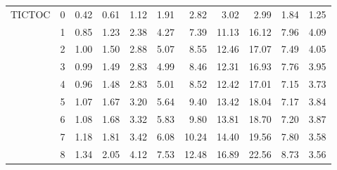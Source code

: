 \begin{tabular}{llrrrrrrrrr}
TICTOC & 0 & 0.42 & 0.61 & 1.12 & 1.91 &  2.82 &  3.02 &  2.99 & 1.84 & 1.25 \\
       & 1 & 0.85 & 1.23 & 2.38 & 4.27 &  7.39 & 11.13 & 16.12 & 7.96 & 4.09 \\
       & 2 & 1.00 & 1.50 & 2.88 & 5.07 &  8.55 & 12.46 & 17.07 & 7.49 & 4.05 \\
       & 3 & 0.99 & 1.49 & 2.83 & 4.99 &  8.46 & 12.31 & 16.93 & 7.76 & 3.95 \\
       & 4 & 0.96 & 1.48 & 2.83 & 5.01 &  8.52 & 12.42 & 17.01 & 7.15 & 3.73 \\
       & 5 & 1.07 & 1.67 & 3.20 & 5.64 &  9.40 & 13.42 & 18.04 & 7.17 & 3.84 \\
       & 6 & 1.08 & 1.68 & 3.32 & 5.83 &  9.80 & 13.81 & 18.70 & 7.20 & 3.87 \\
       & 7 & 1.18 & 1.81 & 3.42 & 6.08 & 10.24 & 14.40 & 19.56 & 7.80 & 3.58 \\
       & 8 & 1.34 & 2.05 & 4.12 & 7.53 & 12.48 & 16.89 & 22.56 & 8.73 & 3.56 \\
\bottomrule
\end{tabular}
